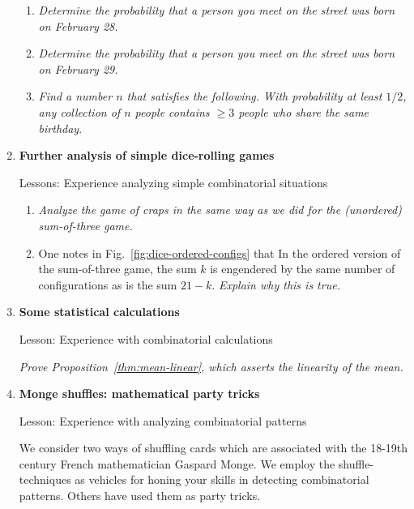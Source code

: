 \begin{enumerate}
  \begin{enumerate}
  \item
{\em Determine the probability that a person you meet on the street was born on February 28.}
  \medskip\item
{\em Determine the probability that a person you meet on the street was born on February 29.} 
  \medskip\item
{\em Find a number $n$ that satisfies the following.  With probability at least $1/2$, any collection of $n$ people contains $\geq 3$ people who share the same birthday}.
  \end{enumerate}  
  

\medskip\item
{\bf Further analysis of simple dice-rolling games}

{\sc Lessons:} Experience analyzing simple combinatorial situations

\smallskip

  \begin{enumerate}
  \item
{\em Analyze the game of craps in the same way as we did for the (unordered) sum-of-three game.}

  \medskip\item
One notes in Fig.~\ref{fig:dice-ordered-configs} that In the ordered version of the sum-of-three game, the sum $k$ is engendered by the same number of configurations as is the sum $21 - k$.  
{\em Explain why this is true.}
  \end{enumerate}
  

\smallskip
\medskip\item
{\bf Some statistical calculations}

{\sc Lesson:} Experience with combinatorial calculations

\smallskip
  
{\em Prove Proposition~\ref{thm:mean-linear}, which asserts the linearity of the mean.}


\medskip\item
{\bf Monge shuffles: mathematical party tricks}

{\sc Lesson:} Experience with analyzing combinatorial patterns

\smallskip

 

We consider two ways of shuffling cards which are associated with the 18-19th century French mathematician Gaspard Monge.  We employ the shuffle-techniques as vehicles for honing your skills in detecting combinatorial patterns.  Others have used them as party tricks.


\end{enumerate}
